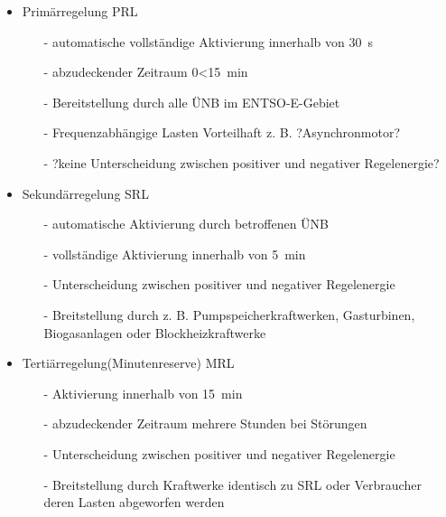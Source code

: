 \documentclass[aspectratio=1610, professionalfonts, 9pt]{beamer}
\begin{document}
\begin{frame}
  \begin{itemize}
    \item Primärregelung PRL
    \begin{itemize}
      \item[-] automatische vollständige Aktivierung innerhalb von \SI{30}{\second}
      \item[-] abzudeckender Zeitraum \num{0}<\SI{15}{\minute}
      \item[-] Bereitstellung durch alle ÜNB im ENTSO-E-Gebiet
      \item[-] Frequenzabhängige Lasten Vorteilhaft z. B. ?Asynchronmotor?
      \item[-] ?keine Unterscheidung zwischen positiver und negativer Regelenergie?
    \end{itemize}
    \item Sekundärregelung SRL
    \begin{itemize}
      \item[-] automatische Aktivierung durch betroffenen ÜNB
      \item[-] vollständige Aktivierung innerhalb von \SI{5}{\minute}
      \item[-] Unterscheidung zwischen positiver und negativer Regelenergie
      \item[-] Breitstellung durch z. B. Pumpspeicherkraftwerken, Gasturbinen, Biogasanlagen oder Blockheizkraftwerke
    \end{itemize}
    \item Tertiärregelung(Minutenreserve) MRL
    \begin{itemize}
      \item[-] Aktivierung innerhalb von \SI{15}{\minute}
      \item[-] abzudeckender Zeitraum mehrere Stunden bei Störungen
      \item[-] Unterscheidung zwischen positiver und negativer Regelenergie
      \item[-] Breitstellung durch Kraftwerke identisch zu SRL oder Verbraucher deren Lasten abgeworfen werden
    \end{itemize}
  \end{itemize}

\end{frame}
\end{document}
